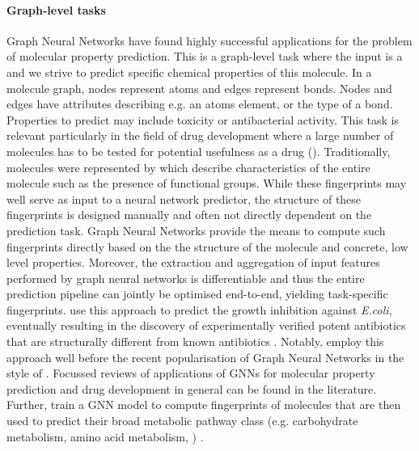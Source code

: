 \documentclass[
	fontsize=10pt, %
	twoside=false, %
	secnumdepth=1, %
]{kaobook}
\begin{document}
\paragraph{Graph-level tasks} Graph Neural Networks have found highly successful
applications for the problem of molecular property prediction. This is a
graph-level task where the input is a  and we strive to
predict specific chemical properties of this molecule. In a molecule graph,
nodes represent atoms and edges represent bonds. Nodes and edges have attributes
describing e.g. an atoms element, or the type of a bond. Properties to predict
may include toxicity or antibacterial activity. This task is relevant
particularly in the field of drug development where a large number of molecules
has to be tested for potential usefulness as a drug ().
%
Traditionally, molecules were represented by  which
describe characteristics of the entire molecule such as the presence of
functional groups. While these fingerprints may well serve as input to a neural
network predictor, the structure of these fingerprints is designed manually and
often not directly dependent on the prediction task.
Graph Neural Networks provide the means to compute such fingerprints directly
based on the the structure of the molecule and concrete, low level properties.
Moreover, the extraction and aggregation of input features performed by graph
neural networks is differentiable and thus the entire prediction pipeline can
jointly be optimised end-to-end, yielding task-specific fingerprints.
\citeauthor{stokes_DeepLearningApproach_2020} use this approach to predict the
growth inhibition against \textit{E.coli}, eventually resulting in the discovery
of experimentally verified potent antibiotics that are structurally different
from known antibiotics \cite{stokes_DeepLearningApproach_2020}.
%
Notably, \citeauthor{duvenaud_convolutional_2015} employ this approach well
before the recent popularisation of Graph Neural Networks in the style of  
.
Focussed reviews of applications of GNNs for molecular property prediction
\cite{wieder_CompactReviewMolecular_2020}
and drug development in general
\cite{gaudelet_utilising_2020}
can be found in the literature.
%
Further, \citeauthor{baranwal_deep_2020} train a GNN model to compute
fingerprints of molecules that are then used to predict their broad metabolic
pathway class (e.g. carbohydrate metabolism, amino acid metabolism, \etc)
\cite{baranwal_deep_2020}.
\end{document}
